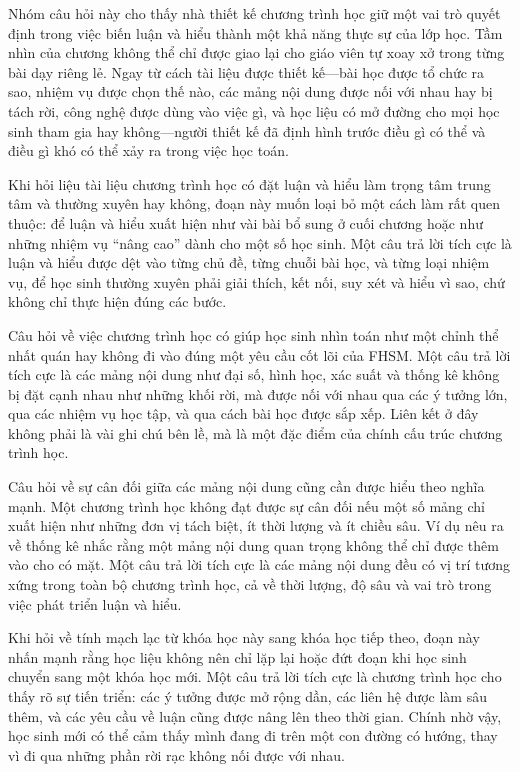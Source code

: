 \documentclass[
  10pt,
  a4paper,
  landscape,
  twoside,
  openany
]{scrbook}
\newcommand{\NOTE}[1]{#1}
\begin{document}
{
\NOTE{Nhóm câu hỏi này cho thấy nhà thiết kế chương trình học giữ một vai trò quyết định trong việc biến luận và hiểu thành một khả năng thực sự của lớp học. Tầm nhìn của chương không thể chỉ được giao lại cho giáo viên tự xoay xở trong từng bài dạy riêng lẻ. Ngay từ cách tài liệu được thiết kế---bài học được tổ chức ra sao, nhiệm vụ được chọn thế nào, các mảng nội dung được nối với nhau hay bị tách rời, công nghệ được dùng vào việc gì, và học liệu có mở đường cho mọi học sinh tham gia hay không---người thiết kế đã định hình trước điều gì có thể và điều gì khó có thể xảy ra trong việc học toán.

Khi hỏi liệu tài liệu chương trình học có đặt luận và hiểu làm trọng tâm trung tâm và thường xuyên hay không, đoạn này muốn loại bỏ một cách làm rất quen thuộc: để luận và hiểu xuất hiện như vài bài bổ sung ở cuối chương hoặc như những nhiệm vụ “nâng cao” dành cho một số học sinh. Một câu trả lời tích cực là luận và hiểu được dệt vào từng chủ đề, từng chuỗi bài học, và từng loại nhiệm vụ, để học sinh thường xuyên phải giải thích, kết nối, suy xét và hiểu vì sao, chứ không chỉ thực hiện đúng các bước.

Câu hỏi về việc chương trình học có giúp học sinh nhìn toán như một chỉnh thể nhất quán hay không đi vào đúng một yêu cầu cốt lõi của FHSM. Một câu trả lời tích cực là các mảng nội dung như đại số, hình học, xác suất và thống kê không bị đặt cạnh nhau như những khối rời, mà được nối với nhau qua các ý tưởng lớn, qua các nhiệm vụ học tập, và qua cách bài học được sắp xếp. Liên kết ở đây không phải là vài ghi chú bên lề, mà là một đặc điểm của chính cấu trúc chương trình học.

Câu hỏi về sự cân đối giữa các mảng nội dung cũng cần được hiểu theo nghĩa mạnh. Một chương trình học không đạt được sự cân đối nếu một số mảng chỉ xuất hiện như những đơn vị tách biệt, ít thời lượng và ít chiều sâu. Ví dụ nêu ra về thống kê nhắc rằng một mảng nội dung quan trọng không thể chỉ được thêm vào cho có mặt. Một câu trả lời tích cực là các mảng nội dung đều có vị trí tương xứng trong toàn bộ chương trình học, cả về thời lượng, độ sâu và vai trò trong việc phát triển luận và hiểu.

Khi hỏi về tính mạch lạc từ khóa học này sang khóa học tiếp theo, đoạn này nhấn mạnh rằng học liệu không nên chỉ lặp lại hoặc đứt đoạn khi học sinh chuyển sang một khóa học mới. Một câu trả lời tích cực là chương trình học cho thấy rõ sự tiến triển: các ý tưởng được mở rộng dần, các liên hệ được làm sâu thêm, và các yêu cầu về luận cũng được nâng lên theo thời gian. Chính nhờ vậy, học sinh mới có thể cảm thấy mình đang đi trên một con đường có hướng, thay vì đi qua những phần rời rạc không nối được với nhau.

}}
\end{document}
